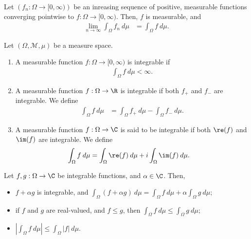 \begin{theorem}
  Let $\left(f_n:\Omega\rightarrow [0,\infty)\right)$ be an inreasing sequence of positive, measurable functions converging pointwise to $f: \Omega\rightarrow [0,\infty)$. Then, $f$ is measurable, and
  \begin{align*}
    \lim_{n\rightarrow\infty}\int_{\Omega}^{} f_n\:d\mu &= \int_{\Omega}^{} f\:d\mu.
  \end{align*}
\end{theorem}
\begin{definition}
  Let $\left(\Omega,\mathcal{M},\mu\right)$ be a measure space.
  \begin{enumerate}[(1)]
    \item A measurable function $f: \Omega\rightarrow [0,\infty)$ is integrable if
      \begin{align*}
        \int_{\Omega}^{} f\:d\mu < \infty.
      \end{align*}
    \item A measurable function $f: \Omega\rightarrow \R$ is integrable if both $f_{+}$ and $f_{-}$ are integrable. We define
      \begin{align*}
        \int_{\Omega}^{} f\:d\mu &= \int_{\Omega}^{} f_{+}\:d\mu - \int_{\Omega}^{} f_{-}\:d\mu.
      \end{align*}
    \item A measurable function $f: \Omega\rightarrow \C$ is said to be integrable if both $\re(f)$ and $\im(f)$ are integrable. We define
      \begin{align*}
        \int_{\Omega}^{} f\:d\mu &= \int_{\Omega}^{} \re(f)\:d\mu + i\int_{\Omega}^{} \im(f)\:d\mu.
      \end{align*}
  \end{enumerate}
\end{definition}
\begin{fact}
  Let $f,g: \Omega\rightarrow \C$ be integrable functions, and $\alpha\in\C$. Then,
  \begin{itemize}
    \item $f + \alpha g$ is integrable, and $\displaystyle \int_{\Omega}^{} \left(f + \alpha g\right)\:d\mu = \int_{\Omega}f\:d\mu + \alpha\int_{\Omega}g\:d\mu$;
    \item if $f$ and $g$ are real-valued, and $f\leq g$, then $\displaystyle \int_{\Omega}^{} f\:d\mu \leq \int_{\Omega}^{} g\:d\mu$;
    \item $\displaystyle \left\vert \int_{\Omega}^{} f\:d\mu \right\vert\leq \int_{\Omega}^{} \left\vert f \right\vert\:d\mu$.
  \end{itemize}
\end{fact}
